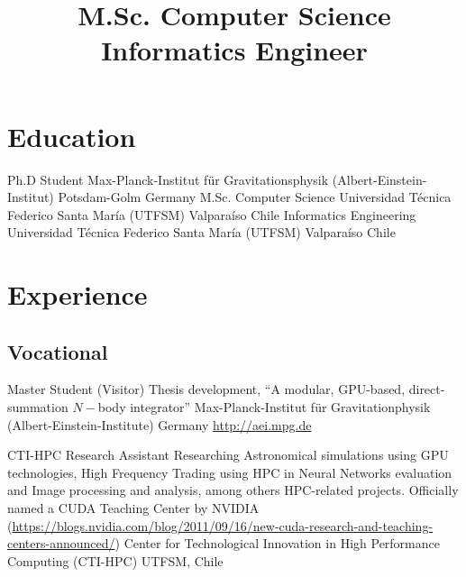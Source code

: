 \documentclass[12pt,a4paper]{moderncv}
\title{\Large M.Sc. Computer Science\newline
Informatics Engineer}
\begin{document}
\maketitle

\vspace{-1cm}
\section{\LARGE Education}

\cventry{\textcolor{color1}{2013 to present}}
        {Ph.D Student}
        {Max-Planck-Institut für Gravitationsphysik (Albert-Einstein-Institut)}
        {}
        {Potsdam-Golm}
        {Germany}
        {M.Sc. Computer Science}
        {Universidad Técnica Federico Santa María (UTFSM)}
        {}
        {Valparaíso}
        {Chile}
        {Informatics Engineering}
        {Universidad Técnica Federico Santa María (UTFSM)}
        {}
        {Valparaíso}
        {Chile}


\section{\LARGE Experience}
\subsection{\Large Vocational}
\vspace{0.3cm}

        {Master Student (Visitor)}
        {Thesis development, %
        ``A modular, GPU-based, direct-summation $N-$body integrator'' }
        {Max-Planck-Institut für Gravitationphysik (Albert-Einstein-Institute)}
        {Germany}
        {\url{http://aei.mpg.de}}

        {CTI-HPC Research Assistant}
        {Researching %
         Astronomical simulations using GPU technologies, %
         High Frequency Trading using HPC in Neural Networks evaluation %
         and Image processing and analysis, among others HPC-related projects.
         Officially named a CUDA Teaching Center by NVIDIA
         (\url{https://blogs.nvidia.com/blog/2011/09/16/new-cuda-research-and-teaching-centers-announced/})
         }
        {Center for Technological Innovation in High Performance Computing (CTI-HPC)}
        {UTFSM, Chile}
        {}
\end{document}
